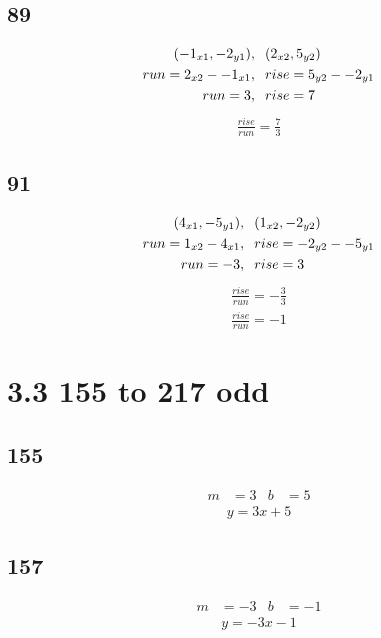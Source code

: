 \documentclass{article}
\begin{document}
    \subsection*{89}
    \begin{align*}
    (-1_{x1}, -2_{y1})&,\hspace{.2cm} (2_{x2}, 5_{y2}) \\
    run = 2_{x2} - -1_{x1}&,\hspace{.2cm}  rise =5_{y2} - -2_{y1}\\
    run = 3&,\hspace{.2cm} rise =  7
    \end{align*}
    \begin{align*}
        \boxed{\frac{rise}{run} = \frac{7}{3}}
    \end{align*}

    \subsection*{91}
    \begin{align*}
    (4_{x1}, -5_{y1})&,\hspace{.2cm} (1_{x2}, -2_{y2}) \\
    run = 1_{x2} - 4_{x1}&,\hspace{.2cm}  rise =-2_{y2} - -5_{y1}\\
    run = -3&,\hspace{.2cm} rise = 3
    \end{align*}
    \begin{align*}
        \frac{rise}{run} = -\frac{3}{3}\\
        \boxed{\frac{rise}{run} = -1}
    \end{align*}

    \section*{3.3 155 to 217 odd}
    \subsection*{155}
    \begin{align*}
        m &= 3 &b &=5
    \end{align*}
    \begin{align*}
        \boxed{y = 3x + 5}
    \end{align*}

    \subsection*{157}
    \begin{align*}
        m &= -3 &b &=-1
    \end{align*}
    \begin{align*}
        \boxed{y = -3x - 1}
    \end{align*}
\end{document}
